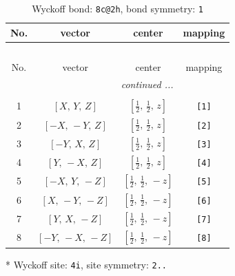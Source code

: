 \documentclass[fleqn,8pt]{jsarticle}
\begin{document}
\begin{longtable}{cccc}
\caption{Wyckoff bond: {\tt 8c@2h}, bond symmetry: {\tt 1}}
 \\
 \hline \hline
No. & vector & center & mapping \\ \hline \endfirsthead

\multicolumn{3}{l}{\tablename\ \thetable{}} \\
 \hline \hline
No. & vector & center & mapping \\ \hline \endhead

 \hline \hline
\multicolumn{3}{r}{\footnotesize\it continued ...} \\ \endfoot

 \hline \hline
\multicolumn{3}{r}{} \\ \endlastfoot

1 & $\left[ X,\, Y,\, Z \right]$ & $\left[ \frac{1}{2},\, \frac{1}{2},\, z \right]$ & {\tt [1]} \\ \hline
2 & $\left[ - X,\, - Y,\, Z \right]$ & $\left[ \frac{1}{2},\, \frac{1}{2},\, z \right]$ & {\tt [2]} \\ \hline
3 & $\left[ - Y,\, X,\, Z \right]$ & $\left[ \frac{1}{2},\, \frac{1}{2},\, z \right]$ & {\tt [3]} \\ \hline
4 & $\left[ Y,\, - X,\, Z \right]$ & $\left[ \frac{1}{2},\, \frac{1}{2},\, z \right]$ & {\tt [4]} \\ \hline
5 & $\left[ - X,\, Y,\, - Z \right]$ & $\left[ \frac{1}{2},\, \frac{1}{2},\, - z \right]$ & {\tt [5]} \\ \hline
6 & $\left[ X,\, - Y,\, - Z \right]$ & $\left[ \frac{1}{2},\, \frac{1}{2},\, - z \right]$ & {\tt [6]} \\ \hline
7 & $\left[ Y,\, X,\, - Z \right]$ & $\left[ \frac{1}{2},\, \frac{1}{2},\, - z \right]$ & {\tt [7]} \\ \hline
8 & $\left[ - Y,\, - X,\, - Z \right]$ & $\left[ \frac{1}{2},\, \frac{1}{2},\, - z \right]$ & {\tt [8]} \\
\end{longtable}
* Wyckoff site: {\tt 4i}, site symmetry: {\tt 2..}
\renewcommand{\arraystretch}{1.2}
\end{document}
